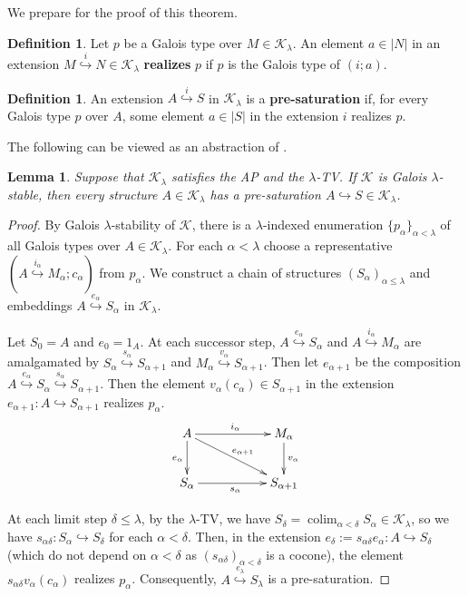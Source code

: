 \documentclass[10pt]{amsart}
\numberwithin{equation}{section}
\theoremstyle{plain}
\newtheorem{lemma}[theorem]{Lemma}
\theoremstyle{definition}
\newtheorem{definition}[theorem]{Definition}
\DeclareMathOperator*{\colim}{colim}
\newcommand{\K}{\mathcal{K}}
\newcommand{\embed}{\hookrightarrow}
\newcommand{\embedge}[1]{\overset{#1}{\embed}}
\begin{document}
We prepare for the proof of this theorem.

\begin{definition}
Let $p$ be a Galois type over $M\in\K_\lambda$.
An element $a\in|N|$ in an extension $M\embedge{i} N\in\K_\lambda$ {\bf realizes} $p$ if $p$ is the Galois type of $(i;a)$.
\end{definition}

\begin{definition}
An extension $A\embedge{i}S$ in $\K_\lambda$ is a {\bf pre-saturation} if, for every Galois type $p$ over $A$, some element $a\in |S|$ in the extension $i$ realizes $p$.
\end{definition}

The following can be viewed as an abstraction of \cite[Lemma 10.3]{Bal09}.

\begin{lemma}\label{lem:pre-saturation}
Suppose that $\K_\lambda$ satisfies the AP and the $\lambda$-TV.
If $\K$ is Galois $\lambda$-stable, then every structure $A\in\K_\lambda$ has a pre-saturation $A\embed S\in\K_\lambda$.
\end{lemma}

\begin{proof}
By Galois $\lambda$-stability of $\K$, there is a $\lambda$-indexed enumeration $\{p_\alpha\}_{\alpha<\lambda}$ of all Galois types over $A\in\K_\lambda$.
For each $\alpha<\lambda$ choose a representative $(A\embedge{i_\alpha} M_\alpha;c_\alpha)$ from $p_\alpha$.
We construct a chain of structures $(S_\alpha)_{\alpha\leq\lambda}$ and embeddings $A\embedge{e_\alpha} S_\alpha$ in $\K_\lambda$.

Let $S_0=A$ and $e_0=1_A$.
At each successor step, 
$A\embedge{e_\alpha}S_\alpha$ and $A\embedge{i_\alpha}M_\alpha$ are amalgamated by $S_\alpha\embedge{s_\alpha}S_{\alpha+1}$ and $M_\alpha\embedge{v_\alpha}S_{\alpha+1}$.
Then let $e_{\alpha+1}$ be the composition $A\embedge{e_\alpha}S_\alpha\embedge{s_\alpha}S_{\alpha+1}$.
Then the element $v_\alpha(c_\alpha)\in S_{\alpha+1}$ in the extension $e_{\alpha+1}\colon A\embed S_{\alpha+1}$ realizes $p_\alpha$.
\[
\xymatrix{
	A \ar[rr]^{i_\alpha}\ar[d]_{e_\alpha} \ar[drr]^{e_{\alpha+1}} & & M_\alpha \ar[d]^{v_\alpha}\\
	S_\alpha \ar[rr]_{s_\alpha} & & S_{\alpha+1}
}
\]

At each limit step $\delta\leq\lambda$, by the $\lambda$-TV, we have $S_\delta=\colim_{\alpha<\delta}S_\alpha\in\K_\lambda$, so we have $s_{\alpha\delta}\colon S_\alpha\embed S_\delta$ for each $\alpha<\delta$.
Then, in the extension $e_\delta:=s_{\alpha\delta}e_\alpha\colon A\embed S_\delta$ (which do not depend on $\alpha<\delta$ as $(s_{\alpha\delta})_{\alpha<\delta}$ is a cocone), the element $s_{\alpha\delta}v_\alpha(c_\alpha)$ realizes $p_\alpha$.
Consequently, $A\embedge{e_\lambda}S_\lambda$ is a pre-saturation.
\end{proof}
\end{document}
